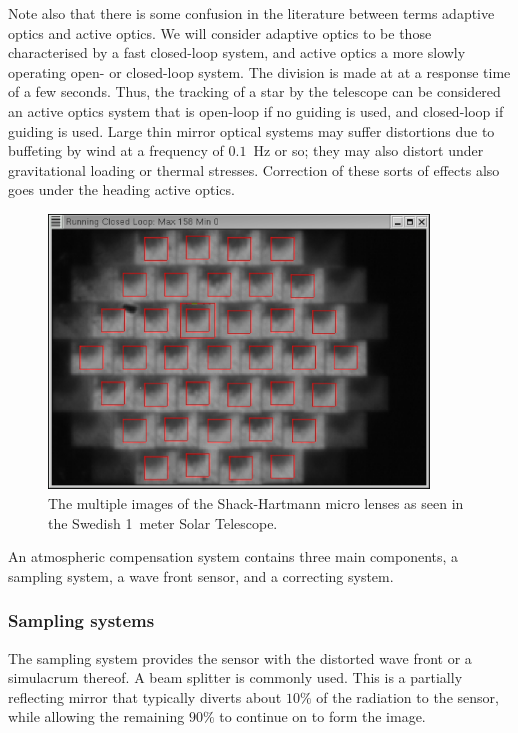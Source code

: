 Note also that there is some confusion in the literature between terms 
adaptive optics and active optics. We will consider adaptive optics to
be those characterised by a fast closed-loop system, and active optics 
a more slowly operating open- or closed-loop system. The division is made
at at a response time of a few seconds. Thus, the tracking of a star by 
the telescope can be considered an active optics system that is open-loop 
if no guiding is used, and closed-loop if guiding is used. Large thin mirror
optical systems may suffer distortions due to buffeting by wind at a 
frequency of $0.1$~Hz or so; they may also distort under gravitational loading
or thermal stresses. Correction of these sorts of effects also goes under
the heading active optics. 

\begin{figure}[h]
	\centering
	\includegraphics[width=0.9\textwidth]{AO_live_display.eps}
  \caption{The multiple images of the Shack-Hartmann micro lenses as seen 
in the Swedish 1~meter Solar Telescope.}
  \label{fig:ao_live_display}
\end{figure}

An atmospheric compensation system contains three main components, a
sampling system, a wave front sensor, and a correcting system.

\subsubsection{Sampling systems}
The sampling system provides the sensor with the 
distorted wave front or a simulacrum thereof. A beam splitter is commonly used.
This is a partially reflecting mirror that typically diverts about 
$10\%$ of the radiation to the sensor, while allowing the remaining $90\%$
 to continue on to form the image. 

